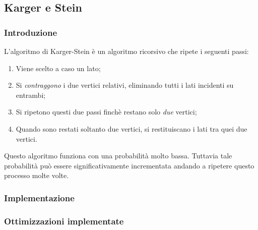 \subsection{Karger e Stein}
\label{karger_stein_section}

\subsubsection{Introduzione}
L'algoritmo di Karger-Stein è un algoritmo ricorsivo che ripete i 
seguenti passi:
\begin{enumerate}
    \item Viene scelto a caso un lato;
    \item Si \textit{contraggono} i due vertici relativi, eliminando tutti i lati incidenti su entrambi;
    \item Si ripetono questi due passi finchè restano solo \textit{due} vertici;
    \item Quando sono restati soltanto due vertici, si restituiscano i lati tra quei due vertici.
\end{enumerate}

Questo algoritmo funziona con una probabilità molto bassa. Tuttavia tale probabilità 
può essere significativamente incrementata andando a ripetere questo processo molte 
volte.

\subsubsection{Implementazione}

\subsubsection{Ottimizzazioni implementate}
